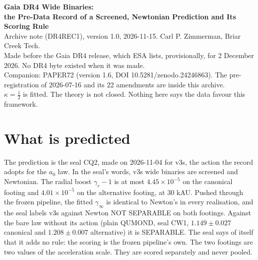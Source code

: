 \documentclass[10pt]{article}
\begin{document}
\begin{center}
{\Large\bfseries Gaia DR4 Wide Binaries:\\ the Pre-Data Record of a Screened, Newtonian Prediction and Its Scoring Rule}\\[6pt]
{\small Archive note (DR4REC1), version 1.0, 2026-11-15. Carl P. Zimmerman, Briar Creek Tech.\\
Made before the Gaia DR4 release, which ESA lists, provisionally, for 2 December 2026. No DR4 byte existed when it was made.\\
Companion: PAPER72 (version 1.6, DOI 10.5281/zenodo.24246863). The pre-registration of 2026-07-16 and its 22 amendments are inside this archive.\\
$\kappa=\tfrac12$ is fitted. The theory is not closed. Nothing here says the data favour this framework.}
\end{center}

\begin{abstract}\noindent
This note is a time stamp, not a result. It puts in one archive everything this research record registered for Gaia DR4 wide binaries before the data: the prediction of the theory the record currently adopts, the rule that will score it, the dated decisions that fix every choice, and the tools that will run on release day.
The adopted theory predicts that wide binaries are screened and Newtonian. The frozen pipeline cannot tell that prediction from Newton's own.
So DR4 can count against the theory, if the sky shows a boost, and it cannot confirm it.
This is an AI-assisted research programme. It is not peer reviewed and no outside group has reproduced it. The record's own scorecard of 2026-11-12 reads: no registered prediction has come true.
\end{abstract}

\section{What is predicted}
The prediction is the seal CQ2, made on 2026-11-04 for v3s, the action the record adopts for the $a_0$ law.
In the seal's words, v3s wide binaries are screened and Newtonian.
The radial boost $\gamma_r-1$ is at most $4.45\times10^{-5}$ on the canonical footing and $4.01\times10^{-5}$ on the alternative footing, at 30 kAU.
Pushed through the frozen pipeline, the fitted $\gamma_\infty$ is identical to Newton's in every realisation, and the seal labels v3s against Newton NOT SEPARABLE on both footings.
Against the bare law without its action (plain QUMOND, seal CW1, $1.149\pm0.027$ canonical and $1.208\pm0.007$ alternative) it is SEPARABLE.
The seal says of itself that it adds no rule: the scoring is the frozen pipeline's own.
The two footings are two values of the acceleration scale. They are scored separately and never pooled.
\end{document}
